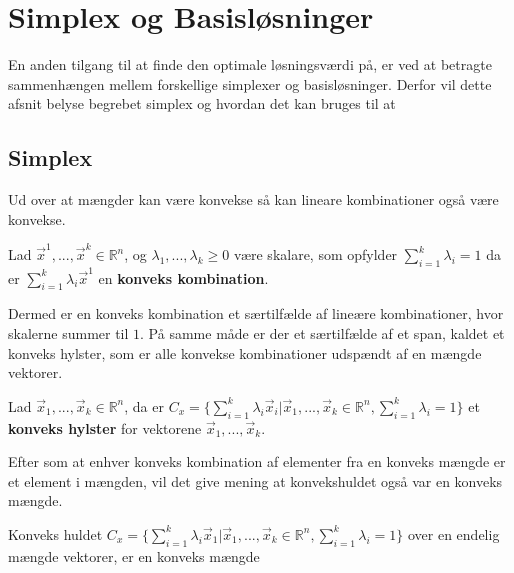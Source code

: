 \section{Simplex og Basisløsninger}
En anden tilgang til at finde den optimale løsningsværdi på, er ved at betragte sammenhængen mellem forskellige simplexer og basisløsninger. 
Derfor vil dette afsnit belyse begrebet simplex og hvordan det kan bruges til at 



\subsection{Simplex}
Ud over at mængder kan være konvekse så kan lineare kombinationer også være konvekse.
\begin{defn}
Lad $\vec{x}^1, ...,\vec{x}^k \in \mathds{R}^n$, og $\lambda_1,..., \lambda_k \geq 0 $ være skalare, som opfylder $\sum_{i=1}^k \lambda_i =1$ da er $\sum_{i=1}^k \lambda_i \vec{x}^1$ en \textbf{konveks kombination}.
\label{def:KonveksKombination}
\end{defn}
Dermed er en konveks kombination et særtilfælde af lineære kombinationer, hvor skalerne summer til $1$.
På samme måde er der et særtilfælde af et span, kaldet et konveks hylster, som er alle konvekse kombinationer udspændt af en mængde vektorer.
\begin{defn}
Lad $\vec{x}_1, ...,\vec{x}_k \in \mathds{R}^n$, da er $C_{x} = \{\sum_{i=1}^k \lambda_i \vec{x}_i| \vec{x}_1, ...,\vec{x}_k \in \mathds{R}^n, \sum_{i=1}^k \lambda_i =1\}$ et \textbf{konveks hylster} for vektorene $\vec{x}_1, ...,\vec{x}_k$. 
\label{def:Konvekshuld}
\end{defn}
Efter som at enhver konveks kombination af elementer fra en konveks mængde er et element i mængden, vil det give mening at konvekshuldet også var en konveks mængde.
\begin{stn}
Konveks huldet $C_x = \{\sum_{i=1}^k \lambda_i \vec{x}_1| \vec{x}_1, ...,\vec{x}_k \in \mathds{R}^n, \sum_{i=1}^k \lambda_i =1\}$ over en endelig mængde vektorer, er en konveks mængde
\end{stn}
